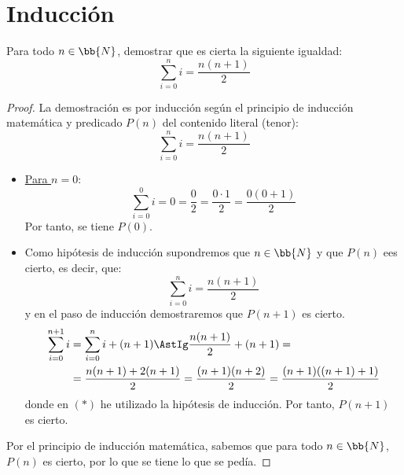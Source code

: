 \section{Inducción}

\begin{ejercicio}\label{ej:1.1}
    Para todo $n\in \bb{N}$, demostrar que es cierta la siguiente igualdad:
    \begin{equation*}
        \sum_{i=0}^n i = \dfrac{n(n+1)}{2}
    \end{equation*}
    \begin{proof}
        La demostración es por inducción según el principio de inducción matemática y predicado $P(n)$ del contenido literal (tenor):
        \begin{equation*}
            \sum_{i=0}^n i = \dfrac{n(n+1)}{2}
        \end{equation*}

        \begin{itemize}
            \item \ul{Para $n=0$}:
            \begin{equation*}
                \sum_{i=0}^0 i = 0 = \frac{0}{2} = \frac{0\cdot 1}{2}
                 = \dfrac{0(0+1)}{2}
            \end{equation*}
            Por tanto, se tiene $P(0)$.

            \item Como hipótesis de inducción supondremos que $n\in \bb{N}$ y que $P(n)$ ees cierto, es decir, que:
            \begin{equation*}
                \sum_{i=0}^n i = \dfrac{n(n+1)}{2}
            \end{equation*}
            y en el paso de inducción demostraremos que $P(n+1)$ es cierto.
            \begin{align*}
                \sum_{i=0}^{n+1} i &= \sum_{i=0}^n i + (n+1)
                \AstIg \dfrac{n(n+1)}{2} + (n+1)
                =\\&= \dfrac{n(n+1) + 2(n+1)}{2}
                = \dfrac{(n+1)(n+2)}{2}
                = \dfrac{(n+1)((n+1)+1)}{2}
            \end{align*}
            donde en $(\ast)$ he utilizado la hipótesis de inducción. Por tanto, $P(n+1)$ es cierto.
        \end{itemize}

        Por el principio de inducción matemática, sabemos que para todo $n\in \bb{N}$, $P(n)$ es cierto, por lo que se tiene lo que se pedía.
    \end{proof}
\end{ejercicio}

